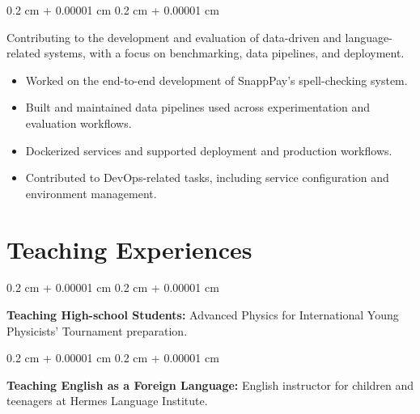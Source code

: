 \documentclass[10pt, letterpaper]{article}
\newenvironment{highlights}{
    \begin{itemize}[
        topsep=0.05 cm,
        parsep=0.04 cm,
        partopsep=0pt,
        itemsep=0pt,
        leftmargin=0.4 cm + 10pt
    ]
}{
    \end{itemize}
} %
\newenvironment{onecolentry}{
    \begin{adjustwidth}{
        0.2 cm + 0.00001 cm
    }{
        0.2 cm + 0.00001 cm
    }
}{
    \end{adjustwidth}
} %
\begin{document}
        \vspace{0.08 cm}
        \begin{onecolentry}
            Contributing to the development and evaluation of data-driven and language-related systems, with a focus on benchmarking, data pipelines, and deployment.

            \vspace{0.08 cm}
            \begin{highlights}
                \item Worked on the end-to-end development of SnappPay's spell-checking system.
                \item Built and maintained data pipelines used across experimentation and evaluation workflows.
                \item Dockerized services and supported deployment and production workflows.
                \item Contributed to DevOps-related tasks, including service configuration and environment management.
            \end{highlights}
        \end{onecolentry}

    \section{Teaching Experiences}        


        \begin{onecolentry}
            \textbf{Teaching High-school Students:} Advanced Physics for International Young Physicists' Tournament preparation.
        \end{onecolentry}

        \vspace{0.2 cm}

        \begin{onecolentry}
            \textbf{Teaching English as a Foreign Language:} English instructor for children and teenagers at Hermes Language Institute.
        \end{onecolentry}
        
\end{document}
